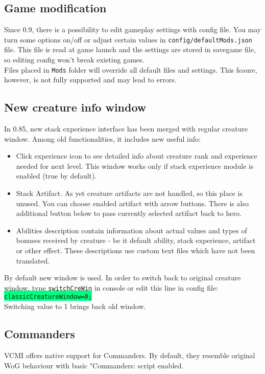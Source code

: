 \documentclass[a4size,final]{article}
\begin{document}
\subsection{Game modification}
Since 0.9, there is a possibility to edit gameplay settings with config file. You may turn some options on/off or adjust certain values in \texttt{config/defaultMods.json} file. This file is read at game launch and the settings are stored in savegame file, so editing config won't break existing games.\\
Files placed in \texttt{Mods} folder will override all default files and settings. This feaure, however, is not fully supported and may lead to errors.
\label{Stack_Experience}
\subsection{New creature info window}
In 0.85, new stack experience interface has been merged with regular creature window. Among old functionalities, it includes new useful info:
\begin{itemize}
\item Click experience icon to see detailed info about creature rank and experience needed for next level. This window works only if stack experience module is enabled (true by default).
\item Stack Artifact. As yet creature artifacts are not handled, so this place is unused. You can choose enabled artifact with arrow buttons. There is also additional button below to pass currently selected artifact back to hero.
\item Abilities description contain information about actual values and types of bonuses received by creature - be it default ability, stack experience, artifact or other effect. These descriptions use custom text files which have not been translated.
\end{itemize}
By default new window is used. In order to switch back to original creature window, type \texttt{switchCreWin} in console or edit this line in config file:\\
\colorbox{SpringGreen}{\texttt{classicCreatureWindow=0;}}\\
Switching value to 1 brings back old window.
\label{Commanders}
\subsection{Commanders}
VCMI offers native support for Commanders. By default, they resemble original WoG behaviour with basic "Commanders: script enabled.
\label{Stack_Artifacts}
\end{document}
